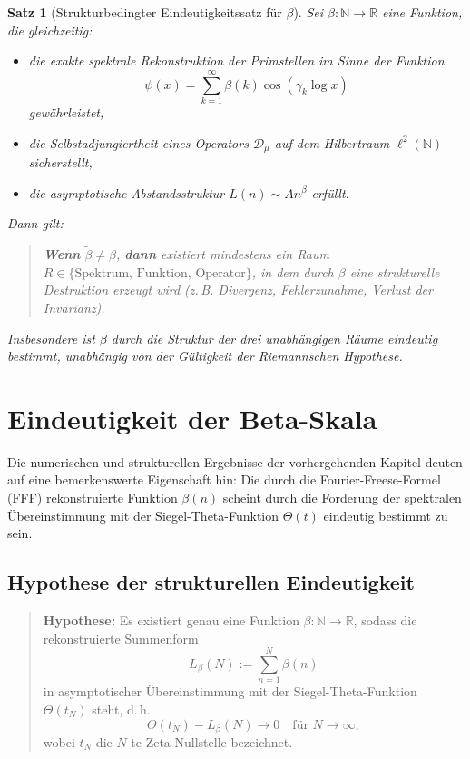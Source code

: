 \documentclass[12pt]{article}
\newtheorem{satz}{Satz}
\begin{document}
\begin{satz}[Strukturbedingter Eindeutigkeitssatz für \boldmath$\beta$]
Sei \(\beta : \mathbb{N} \to \mathbb{R}\) eine Funktion, die gleichzeitig:

\begin{itemize}
  \item[(i)] die exakte spektrale Rekonstruktion der Primstellen im Sinne der Funktion
    \[
    \psi(x) = \sum_{k=1}^{\infty} \beta(k) \cos(\gamma_k \log x)
    \]
    gewährleistet,
  \item[(ii)] die Selbstadjungiertheit eines Operators \(\mathcal{D}_\mu\) auf dem Hilbertraum \(\ell^2(\mathbb{N})\) sicherstellt,
  \item[(iii)] die asymptotische Abstandsstruktur \(L(n) \sim A n^{\beta}\) erfüllt.
\end{itemize}

Dann gilt:
\begin{quote}
\textbf{Wenn} \(\tilde{\beta} \neq \beta\), \textbf{dann} existiert mindestens ein Raum \(R \in \{\text{Spektrum, Funktion, Operator}\}\), in dem durch \(\tilde{\beta}\) eine strukturelle Destruktion erzeugt wird (z.\,B. Divergenz, Fehlerzunahme, Verlust der Invarianz).
\end{quote}

Insbesondere ist \(\beta\) durch die Struktur der drei unabhängigen Räume eindeutig bestimmt, unabhängig von der Gültigkeit der Riemannschen Hypothese.
\end{satz}

\section{Eindeutigkeit der Beta-Skala}

Die numerischen und strukturellen Ergebnisse der vorhergehenden Kapitel deuten auf eine bemerkenswerte Eigenschaft hin: Die durch die Fourier-Freese-Formel (FFF) rekonstruierte Funktion \(\beta(n)\) scheint durch die Forderung der spektralen Übereinstimmung mit der Siegel-Theta-Funktion \(\Theta(t)\) eindeutig bestimmt zu sein.

\subsection{Hypothese der strukturellen Eindeutigkeit}

\begin{quote}
\textbf{Hypothese:} Es existiert genau eine Funktion \(\beta : \mathbb{N} \to \mathbb{R}\), sodass die rekonstruierte Summenform
\[
L_{\beta}(N) := \sum_{n=1}^{N} \beta(n)
\]
in asymptotischer Übereinstimmung mit der Siegel-Theta-Funktion \(\Theta(t_N)\) steht, d.\,h.
\[
\Theta(t_N) - L_{\beta}(N) \to 0 \quad \text{für } N \to \infty,
\]
wobei \(t_N\) die \(N\)-te Zeta-Nullstelle bezeichnet.
\end{quote}
\end{document}
